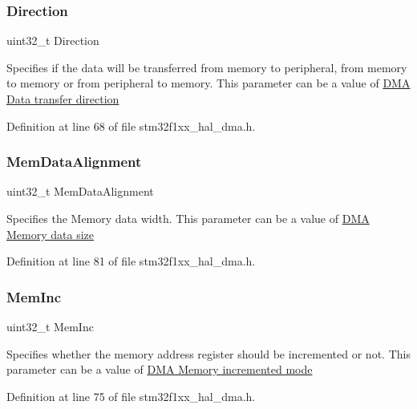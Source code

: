 \subsubsection{\texorpdfstring{Direction}{Direction}}
{\footnotesize\ttfamily uint32\+\_\+t Direction}

Specifies if the data will be transferred from memory to peripheral, from memory to memory or from peripheral to memory. This parameter can be a value of \hyperlink{group___d_m_a___data__transfer__direction}{D\+MA Data transfer direction} 

Definition at line 68 of file stm32f1xx\+\_\+hal\+\_\+dma.\+h.

\mbox{\label{struct_d_m_a___init_type_def_afe3adac32f5411b1a744c030f398aa5e}} 
\subsubsection{\texorpdfstring{Mem\+Data\+Alignment}{MemDataAlignment}}
{\footnotesize\ttfamily uint32\+\_\+t Mem\+Data\+Alignment}

Specifies the Memory data width. This parameter can be a value of \hyperlink{group___d_m_a___memory__data__size}{D\+MA Memory data size} 

Definition at line 81 of file stm32f1xx\+\_\+hal\+\_\+dma.\+h.

\mbox{\label{struct_d_m_a___init_type_def_a831756fbcd64feb1e570a9bf743b5b8d}} 
\subsubsection{\texorpdfstring{Mem\+Inc}{MemInc}}
{\footnotesize\ttfamily uint32\+\_\+t Mem\+Inc}

Specifies whether the memory address register should be incremented or not. This parameter can be a value of \hyperlink{group___d_m_a___memory__incremented__mode}{D\+MA Memory incremented mode} 

Definition at line 75 of file stm32f1xx\+\_\+hal\+\_\+dma.\+h.

